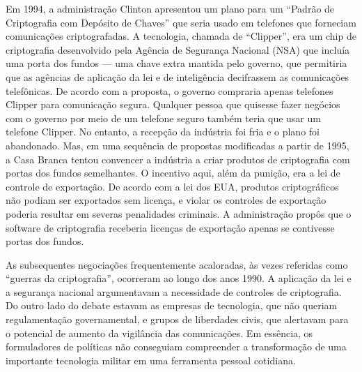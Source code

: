 \documentclass{book}
\begin{document}
Em 1994, a administração Clinton apresentou um plano para um ``Padrão de Criptografia com Depósito de Chaves'' que seria usado em telefones que forneciam comunicações criptografadas. A tecnologia, chamada de ``Clipper'', era um chip de criptografia desenvolvido pela Agência de Segurança Nacional (NSA) que incluía uma porta dos fundos --- uma chave extra mantida pelo governo, que permitiria que as agências de aplicação da lei e de inteligência decifrassem as comunicações telefônicas. De acordo com a proposta, o governo compraria apenas telefones Clipper para comunicação segura. Qualquer pessoa que quisesse fazer negócios com o governo por meio de um telefone seguro também teria que usar um telefone Clipper. No entanto, a recepção da indústria foi fria e o plano foi abandonado. Mas, em uma sequência de propostas modificadas a partir de 1995, a Casa Branca tentou convencer a indústria a criar produtos de criptografia com portas dos fundos semelhantes. O incentivo aqui, além da punição, era a lei de controle de exportação. De acordo com a lei dos EUA, produtos criptográficos não podiam ser exportados sem licença, e violar os controles de exportação poderia resultar em severas penalidades criminais. A administração propôs que o software de criptografia receberia licenças de exportação apenas se contivesse portas dos fundos.

As subsequentes negociações frequentemente acaloradas, às vezes referidas como ``guerras da criptografia'', ocorreram ao longo dos anos 1990. A aplicação da lei e a segurança nacional argumentavam a necessidade de controles de criptografia. Do outro lado do debate estavam as empresas de tecnologia, que não queriam regulamentação governamental, e grupos de liberdades civis, que alertavam para o potencial de aumento da vigilância das comunicações. Em essência, os formuladores de políticas não conseguiam compreender a transformação de uma importante tecnologia militar em uma ferramenta pessoal cotidiana.
\end{document}
